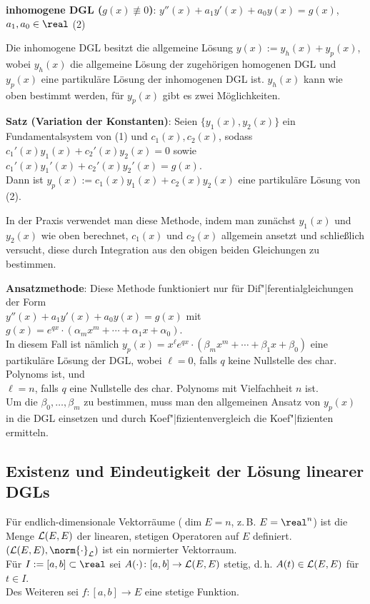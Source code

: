 \linie

\textbf{inhomogene DGL ($g(x) \not\equiv 0$)}:
$y''(x) + a_1 y'(x) + a_0 y(x) = g(x)$, $a_1, a_0 \in \real$ \qquad (2)

Die inhomogene DGL besitzt die allgemeine Lösung
$y(x) := y_h(x) + y_p(x)$, wobei $y_h(x)$ die allgemeine Lösung der zugehörigen
homogenen DGL und $y_p(x)$ eine partikuläre Lösung der inhomogenen DGL ist.
$y_h(x)$ kann wie oben bestimmt werden, für $y_p(x)$ gibt es zwei
Möglichkeiten.

\textbf{Satz (Variation der Konstanten)}:
Seien $\{y_1(x), y_2(x)\}$ ein Fundamentalsystem von (1) und $c_1(x), c_2(x)$,
sodass $c_1'(x) y_1(x) + c_2'(x) y_2(x) = 0$ sowie
$c_1'(x) y_1'(x) + c_2'(x) y_2'(x) = g(x)$. \\
Dann ist $y_p(x) := c_1(x) y_1(x) + c_2(x) y_2(x)$ eine partikuläre
Lösung von (2).

In der Praxis verwendet man diese Methode, indem man zunächst $y_1(x)$ und
$y_2(x)$ wie oben berechnet, $c_1(x)$ und $c_2(x)$ allgemein ansetzt und
schließlich versucht, diese durch Integration aus den obigen beiden Gleichungen
zu bestimmen.

\textbf{Ansatzmethode}:
Diese Methode funktioniert nur für Dif"|ferentialgleichungen der Form \\
$y''(x) + a_1 y'(x) + a_0 y(x) = g(x)$
mit $g(x) = e^{qx} \cdot (\alpha_m x^m + \dotsb + \alpha_1 x + \alpha_0)$. \\
In diesem Fall ist nämlich
$y_p(x) = x^\ell e^{qx} \cdot (\beta_m x^m + \dotsb + \beta_1 x + \beta_0)$
eine partikuläre Lösung der DGL, wobei
$\ell = 0$, falls $q$ keine Nullstelle des char. Polynoms ist, und \\
$\ell = n$, falls $q$ eine Nullstelle des char. Polynoms mit
Vielfachheit $n$ ist. \\
Um die $\beta_0, \dotsc, \beta_m$ zu bestimmen, muss man
den allgemeinen Ansatz von $y_p(x)$ in die DGL einsetzen und durch
Koef"|fizientenvergleich die Koef"|fizienten ermitteln.

\pagebreak

\subsection{%
    Existenz und Eindeutigkeit der Lösung linearer DGLs%
}

Für endlich-dimensionale Vektorräume ($\dim E = n$, z.\,B. $E = \real^n$)
ist die Menge $\mathcal{L}(E, E)$ der linearen, stetigen Operatoren auf $E$ definiert.
$(\L(E, E), \norm{\cdot}_\L)$ ist ein normierter Vektorraum. \\
Für $I := [a, b] \subset \real$ sei $A(\cdot)\colon [a, b] \rightarrow \mathcal{L}(E, E)$
stetig, d.\,h. $A(t) \in \mathcal{L}(E, E)$ für $t \in I$. \\
Des Weiteren sei $f\colon [a, b] \rightarrow E$ eine stetige Funktion.

